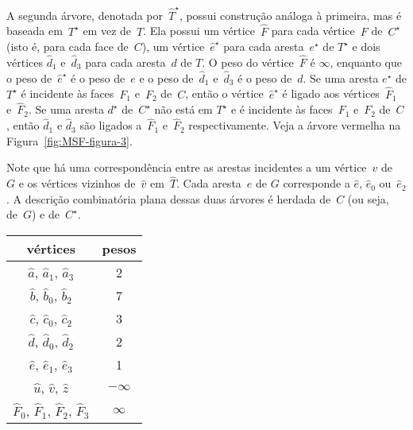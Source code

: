 A segunda árvore, denotada por~$\hat T^\star$, possui construção análoga à primeira, mas é baseada em~$T^\star$ em vez de~$T$.
Ela possui um vértice~$\hat F$ para cada vértice~$F$ de~$C^\star$ (isto é, para cada face de~$C$), um vértice~$\hat e^\star$ para cada aresta~$e^\star$ de $T^\star$ e dois vértices $\hat d_1$ e~$\hat d_3$ para cada aresta~$d$ de $T$.
O peso do vértice~$\hat F$ é $\infty$, enquanto que o peso de~$\hat e^\star$ é o peso de~$e$ e o peso de~$\hat d_1$ e~$\hat d_3$ é o peso de~$d$.
Se uma aresta $e^\star$ de $T^\star$ é incidente às faces~$F_1$ e~$F_2$ de~$C$, então o vértice~$\hat e^\star$ é ligado aos vértices~$\hat F_1$ e~$\hat F_2$.
Se uma aresta $d^\star$ de~$C^\star$ não está em $T^\star$ e é incidente às faces~$F_1$ e~$F_2$ de~$C$, então $\hat d_1$ e $\hat d_3$ são ligados a~$\hat F_1$ e~$\hat F_2$ respectivamente.
Veja a árvore vermelha na Figura~\ref{fig:MSF-figura-3}.

Note que há uma correspondência entre as arestas incidentes a um vértice~$v$ de~$G$ e os vértices vizinhos de~$\hat v$ em~$\hat T$.
Cada aresta~$e$ de $G$ corresponde a $\hat e$, $\hat e_0$ ou~$\hat e_2$. 
A descrição combinatória plana dessas duas árvores é herdada de~$C$ (ou seja, de~$G$) e de~$C^\star$.



\begin{minipage}[b]{0.4\textwidth}
\centering
\begin{tabular}{| c  c |} 
 \hline
 vértices & pesos\\
 \hline
 $\hat a$, $\hat a_1$, $\hat a_3$ & 2 \\ 
 \hline
 $\hat b$, $\hat b_0$, $\hat b_2$ & 7 \\
 \hline
 $\hat c$, $\hat c_0$, $\hat c_2$ & 3 \\
 \hline
 $\hat d$, $\hat d_0$, $\hat d_2$ & 2 \\
 \hline
 $\hat e$, $\hat e_1$, $\hat e_3$ & 1 \\
 \hline
 $\hat u$, $\hat v$, $\hat z$ & $-\infty$ \\
 \hline
 $\hat F_0$, $\hat F_1$, $\hat F_2$, $\hat F_3$ & $\infty$ \\
 \hline
\end{tabular}
\end{minipage}
\hfill
\begin{minipage}[b]{0.5\textwidth}
    \centering

\label{fig:MSF-figura-3}
    \end{minipage}

